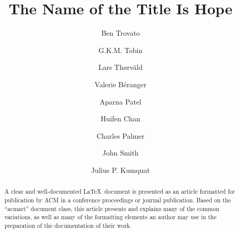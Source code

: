 \documentclass[manuscript,screen,review]{acmart}
\begin{document}
\title{The Name of the Title Is Hope}

\author{Ben Trovato}
\author{G.K.M. Tobin}
\authornotemark[1]

\author{Lars Th{\o}rv{\"a}ld}

\author{Valerie B\'eranger}

\author{Aparna Patel}

\author{Huifen Chan}

\author{Charles Palmer}

\author{John Smith}

\author{Julius P. Kumquat}

\renewcommand{\shortauthors}{Trovato et al.}

\begin{abstract}
  A clear and well-documented \LaTeX\ document is presented as an
  article formatted for publication by ACM in a conference proceedings
  or journal publication. Based on the ``acmart'' document class, this
  article presents and explains many of the common variations, as well
  as many of the formatting elements an author may use in the
  preparation of the documentation of their work.
\end{abstract}
\end{document}
